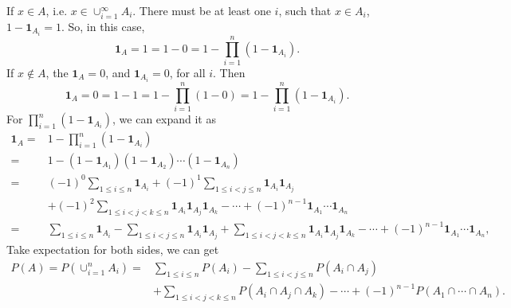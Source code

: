 \documentclass[en, normal, 11pt, black]{elegantnote}
\renewenvironment{proof}{\begin{tcolorbox}[colback=white, colframe=black!50, breakable, title=Proof. ]\setlength{\parskip}{0.8em}}{\,\\\rightline{$\square$}\end{tcolorbox}}
\begin{document}
    \begin{proof}
        If $x\in A$, i.e. $x\in \cup_{i=1}^\infty A_i$. There must be at least one $i$, such that $x\in A_i$, $1-\mathbf{1}_{A_i}=1$. So, in this case, 
        \[
            \mathbf{1}_A=1=1-0=1-\prod_{i=1}^n(1-\mathbf{1}_{A_i}). 
        \] 
        If $x\not\in A$, the $\mathbf{1}_A=0$, and $\mathbf{1}_{A_i}=0$, for all $i$. Then
        \[
            \mathbf{1}_{A}=0=1-1=1-\prod_{i=1}^n(1-0)=1-\prod_{i=1}^n(1-\mathbf{1}_{A_i}). 
        \]
        For $\prod_{i=1}^n(1-\mathbf{1}_{A_i})$, we can expand it as
        \begin{align*}
            \mathbf{1}_A=&1-\prod_{i=1}^n(1-\mathbf{1}_{A_i})\\
            =&1-(1-\mathbf{1}_{A_1})(1-\mathbf{1}_{A_2})\cdots(1-\mathbf{1}_{A_n})\\
            =&(-1)^{0}\sum_{1\leqslant i\leqslant n}\mathbf{1}_{A_i}+(-1)^{1}\sum_{1\leqslant i<j\leqslant n}\mathbf{1}_{A_i}\mathbf{1}_{A_j}\\
            &+(-1)^{2}\sum_{1\leqslant i<j<k\leqslant n}\mathbf{1}_{A_i}\mathbf{1}_{A_j}\mathbf{1}_{A_k}-\cdots+(-1)^{n-1}\mathbf{1}_{A_1}\cdots\mathbf{1}_{A_n}\\
            =&\sum_{1\leqslant i\leqslant n}\mathbf{1}_{A_i}-\sum_{1\leqslant i<j\leqslant n}\mathbf{1}_{A_i}\mathbf{1}_{A_j}
            +\sum_{1\leqslant i<j<k\leqslant n}\mathbf{1}_{A_i}\mathbf{1}_{A_j}\mathbf{1}_{A_k}-\cdots+(-1)^{n-1}\mathbf{1}_{A_1}\cdots\mathbf{1}_{A_n}, 
        \end{align*}
        Take expectation for both sides, we can get
        \begin{align*}
            P(A)=P(\cup_{i=1}^nA_i)=&\sum_{1\leqslant i\leqslant n}P(A_i)-\sum_{1\leqslant i<j\leqslant n}P(A_i\cap A_j)\\
            &+\sum_{1\leqslant i<j<k\leqslant n}P(A_i\cap A_j\cap A_k)-\cdots+(-1)^{n-1}P(A_1\cap\cdots\cap A_n). 
        \end{align*}
        \vspace{-30pt}
    \end{proof}

\end{document}
